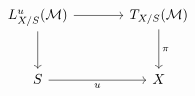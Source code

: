 \[
\begin{tikzcd}[column sep=large,row sep=large]
L^u_{X/S}(\mathcal M) \arrow[r] \arrow[d] & T_{X/S}(\mathcal M) \arrow[d,"\pi"]\\
S \arrow[r,"u"'] & X
\end{tikzcd}
\]
